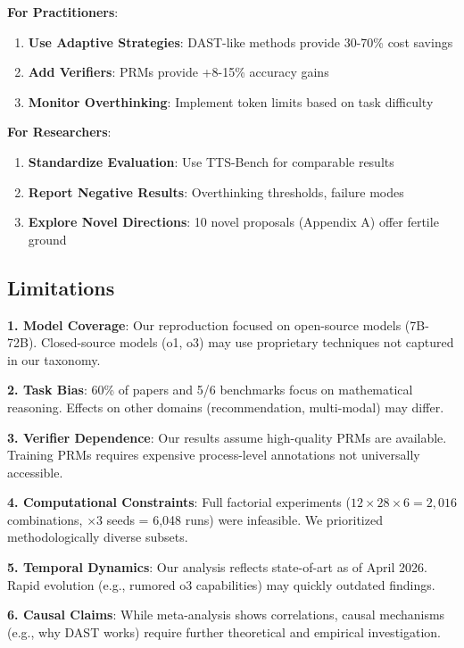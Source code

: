 \documentclass[10pt,preprint]{neurips_2024}
\begin{document}
\textbf{For Practitioners}:
\begin{enumerate}
    \item \textbf{Use Adaptive Strategies}: DAST-like methods provide 30-70\% cost savings
    \item \textbf{Add Verifiers}: PRMs provide +8-15\% accuracy gains
    \item \textbf{Monitor Overthinking}: Implement token limits based on task difficulty
\end{enumerate}

\textbf{For Researchers}:
\begin{enumerate}
    \item \textbf{Standardize Evaluation}: Use TTS-Bench for comparable results
    \item \textbf{Report Negative Results}: Overthinking thresholds, failure modes
    \item \textbf{Explore Novel Directions}: 10 novel proposals (Appendix A) offer fertile ground
\end{enumerate}

\subsection{Limitations}

\textbf{1. Model Coverage}: Our reproduction focused on open-source models (7B-72B). Closed-source models (o1, o3) may use proprietary techniques not captured in our taxonomy.

\textbf{2. Task Bias}: 60\% of papers and 5/6 benchmarks focus on mathematical reasoning. Effects on other domains (recommendation, multi-modal) may differ.

\textbf{3. Verifier Dependence}: Our results assume high-quality PRMs are available. Training PRMs requires expensive process-level annotations not universally accessible.

\textbf{4. Computational Constraints}: Full factorial experiments ($12 \times 28 \times 6 = 2,016$ combinations, $\times 3$ seeds = 6,048 runs) were infeasible. We prioritized methodologically diverse subsets.

\textbf{5. Temporal Dynamics}: Our analysis reflects state-of-art as of April 2026. Rapid evolution (e.g., rumored o3 capabilities) may quickly outdated findings.

\textbf{6. Causal Claims}: While meta-analysis shows correlations, causal mechanisms (e.g., why DAST works) require further theoretical and empirical investigation.
\end{document}
